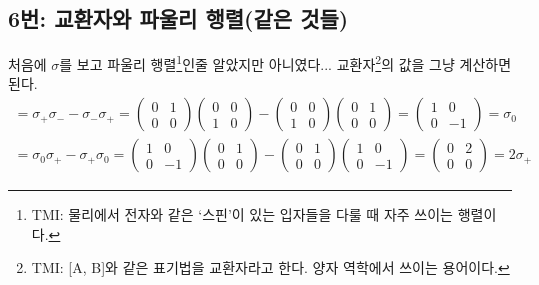 \subsection{6번: 교환자와 파울리 행렬(같은 것들)}
처음에 $\sigma$를 보고 파울리 행렬\footnote{TMI: 물리에서 전자와 같은 `스핀'이 있는 입자들을 다룰 때 자주 쓰이는 행렬이다.}인줄 알았지만 아니였다... 교환자\footnote{TMI: [A, B]와 같은 표기법을 교환자라고 한다. 양자 역학에서 쓰이는 용어이다.}의 값을 그냥 계산하면 된다.
\begin{align*}
[\sigma_+, \sigma_-]=\sigma_+\sigma_--\sigma_-\sigma_+=
\begin{pmatrix}
0 & 1 \\
0 & 0
\end{pmatrix}
\begin{pmatrix}
0 & 0 \\
1 & 0
\end{pmatrix}-
\begin{pmatrix}
0 & 0 \\
1 & 0
\end{pmatrix}
\begin{pmatrix}
0 & 1 \\
0 & 0
\end{pmatrix}=
\begin{pmatrix}
1 & 0 \\
0 & -1
\end{pmatrix}=\sigma_0
\end{align*}
\begin{align*}
[\sigma_0, \sigma_+]=\sigma_0\sigma_+-\sigma_+\sigma_0=
\begin{pmatrix}
1 & 0 \\
0 & -1
\end{pmatrix}
\begin{pmatrix}
0 & 1 \\
0 & 0
\end{pmatrix}-
\begin{pmatrix}
0 & 1 \\
0 & 0
\end{pmatrix}
\begin{pmatrix}
1 & 0 \\
0 & -1
\end{pmatrix}=
\begin{pmatrix}
0 & 2 \\
0 & 0
\end{pmatrix}=2\sigma_+
\end{align*}

